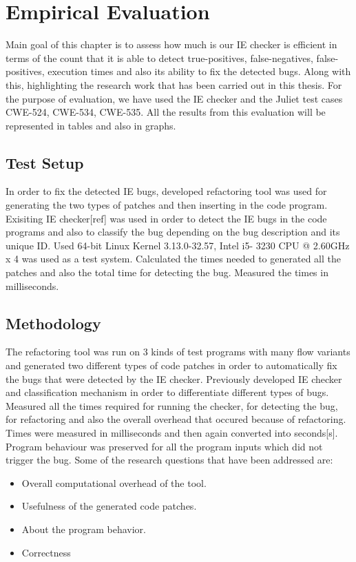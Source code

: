 \let\cleardoublepage\clearpage
\chapter{Empirical Evaluation}
\label{chapter:Evaluation}

Main goal of this chapter is to assess how much is our IE checker
is efficient in terms of the count that it is able to detect true-positives,
false-negatives, false-positives, execution times and also its ability to fix
the detected bugs. Along with this, highlighting the research work that has
been carried out in this thesis. For the purpose of evaluation, we have used
the IE checker and the Juliet test cases CWE-524, CWE-534, CWE-535. All the results
from this evaluation will be represented in tables and also in graphs.



\section{Test Setup}

In order to fix the detected IE bugs, developed refactoring tool was used
for generating the two types of patches and then inserting in the
code program. Exisiting IE checker[ref] was used in order to detect the 
IE bugs in the code programs and also to classify the bug depending on the
bug description and its unique ID. Used 64-bit Linux Kernel 3.13.0-32.57, Intel i5-
3230 CPU @ 2.60GHz x 4 was used as a test system. Calculated the times needed to generated
all the patches and also the total time for detecting the bug. Measured
the times in milliseconds.


\section{Methodology}

The refactoring tool was run on 3 kinds of test programs with many flow variants
and generated two different types of code patches in order to 
automatically fix the bugs that were detected by the IE checker. Previously developed
IE checker and classification mechanism in order to differentiate different
types of bugs. Measured all the times required for running the checker,
for detecting the bug, for refactoring and also the overall overhead that occured
because of refactoring. Times were measured in milliseconds and then again
converted into seconds[s]. Program behaviour was preserved for all the program
inputs which did not trigger the bug. Some of the research questions that have been 
addressed are:
\begin{itemize}
 \item Overall computational overhead of the tool.
 \item Usefulness of the generated code patches.
 \item About the program behavior.
 \item Correctness
\end{itemize}


